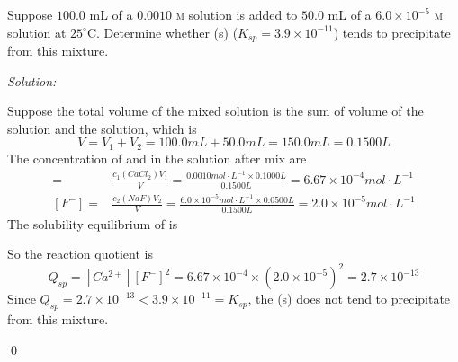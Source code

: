 \documentclass[12pt]{article}
\newenvironment{problem}[2][Problem]{\begin{trivlist}
\item[\hskip \labelsep {\bfseries #1}\hskip \labelsep {\bfseries #2.}]}{\end{trivlist}}
\newenvironment{sol}
    {\emph{Solution:}
    }
    {
    \qed
    }
\begin{document}
\begin{problem}{16.20}
Suppose $100.0$ mL of a $0.0010$ \textsc{m}  solution is added to $50.0$ mL of a $6.0\times10^{-5}$ \textsc{m}  solution at $25^{\circ}$C. Determine whether (s) ($K_{sp}=3.9\times10^{-11}$) tends to precipitate from this mixture.
\end{problem}
\begin{sol}
Suppose the total volume of the mixed solution is the sum of volume of the  solution and the  solution, which is
\[
V=V_1+V_2=100.0mL+50.0mL=150.0mL=0.1500L
\]
The concentration of  and  in the solution after mix are
\begin{align*}
[Ca^{2+}]=&\frac{c_1(CaCl_2)V_1}{V}=\frac{0.0010mol\cdot L^{-1}\times0.1000L}{0.1500L}=6.67\times10^{-4}mol\cdot L^{-1}\\
[F^-]=&\frac{c_2(NaF)V_2}{V}=\frac{6.0\times10^{-5}mol\cdot L^{-1}\times0.0500L}{0.1500L}=2.0\times10^{-5}mol\cdot L^{-1}
\end{align*}
The solubility equilibrium of  is
\begin{center}
\end{center}
So the reaction quotient is
\[
Q_{sp}=[Ca^{2+}][F^-]^2=6.67\times10^{-4}\times(2.0\times10^{-5})^2=2.7\times10^{-13}
\]
Since $Q_{sp}=2.7\times10^{-13}<3.9\times10^{-11}=K_{sp}$, the (s) \uline{does not tend to precipitate} from this mixture.
\end{sol}
\end{document}
